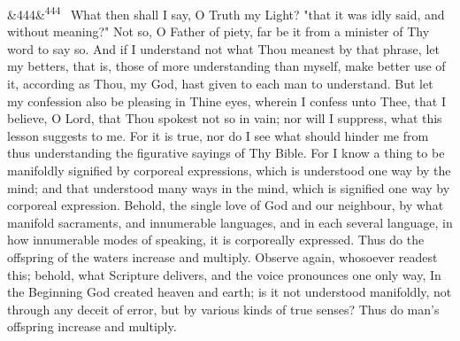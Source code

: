 \documentclass[12pt]{article}
\newcommand{\para}[1][]{\par\noindent\ifx&#1&\else\textsuperscript{\footnotesize #1}~\fi}
\begin{document}
\para[444] What then shall I say, O Truth my Light? "that it was idly said, and without meaning?" Not so, O Father of piety, far be it from a minister of Thy word to say so. And if I understand not what Thou meanest by that phrase, let my betters, that is, those of more understanding than myself, make better use of it, according as Thou, my God, hast given to each man to understand. But let my confession also be pleasing in Thine eyes, wherein I confess unto Thee, that I believe, O Lord, that Thou spokest not so in vain; nor will I suppress, what this lesson suggests to me. For it is true, nor do I see what should hinder me from thus understanding the figurative sayings of Thy Bible. For I know a thing to be manifoldly signified by corporeal expressions, which is understood one way by the mind; and that understood many ways in the mind, which is signified one way by corporeal expression. Behold, the single love of God and our neighbour, by what manifold sacraments, and innumerable languages, and in each several language, in how innumerable modes of speaking, it is corporeally expressed. Thus do the offspring of the waters increase and multiply. Observe again, whosoever readest this; behold, what Scripture delivers, and the voice pronounces one only way, In the Beginning God created heaven and earth; is it not understood manifoldly, not through any deceit of error, but by various kinds of true senses? Thus do man's offspring increase and multiply.
\end{document}
